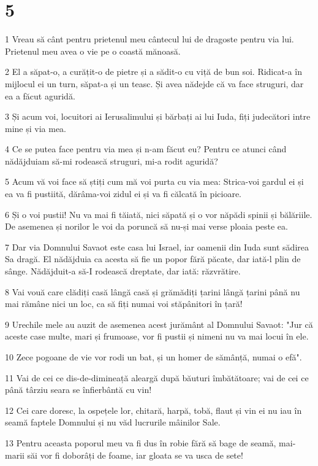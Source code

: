 \chapter{5}

\par 1 Vreau să cânt pentru prietenul meu cântecul lui de dragoste pentru via lui. Prietenul meu avea o vie pe o coastă mănoasă.
\par 2 El a săpat-o, a curățit-o de pietre și a sădit-o cu viță de bun soi. Ridicat-a în mijlocul ei un turn, săpat-a și un teasc. Și avea nădejde că va face struguri, dar ea a făcut aguridă.
\par 3 Și acum voi, locuitori ai Ierusalimului și bărbați ai lui Iuda, fiți judecători intre mine și via mea.
\par 4 Ce se putea face pentru via mea și n-am făcut eu? Pentru ce atunci când nădăjduiam să-mi rodească struguri, mi-a rodit aguridă?
\par 5 Acum vă voi face să știți cum mă voi purta cu via mea: Strica-voi gardul ei și ea va fi pustiită, dărâma-voi zidul ei și va fi călcată în picioare.
\par 6 Și o voi pustii! Nu va mai fi tăiată, nici săpată și o vor năpădi spinii și bălăriile. De asemenea și norilor le voi da poruncă să nu-și mai verse ploaia peste ea.
\par 7 Dar via Domnului Savaot este casa lui Israel, iar oamenii din Iuda sunt sădirea Sa dragă. El nădăjduia ca acesta să fie un popor fără păcate, dar iată-l plin de sânge. Nădăjduit-a să-I rodească dreptate, dar iată: răzvrătire.
\par 8 Vai vouă care clădiți casă lângă casă și grămădiți țarini lângă țarini până nu mai rămâne nici un loc, ca să fiți numai voi stăpânitori în țară!
\par 9 Urechile mele au auzit de asemenea acest jurământ al Domnului Savaot: "Jur că aceste case multe, mari și frumoase, vor fi pustii și nimeni nu va mai locui în ele.
\par 10 Zece pogoane de vie vor rodi un bat, și un homer de sămânță, numai o efă".
\par 11 Vai de cei ce dis-de-dimineață aleargă după băuturi îmbătătoare; vai de cei ce până târziu seara se înfierbântă cu vin!
\par 12 Cei care doresc, la ospețele lor, chitară, harpă, tobă, flaut și vin ei nu iau în seamă faptele Domnului și nu văd lucrurile mâinilor Sale.
\par 13 Pentru aceasta poporul meu va fi dus în robie fără să bage de seamă, mai-marii săi vor fi doborâți de foame, iar gloata se va usca de sete!
